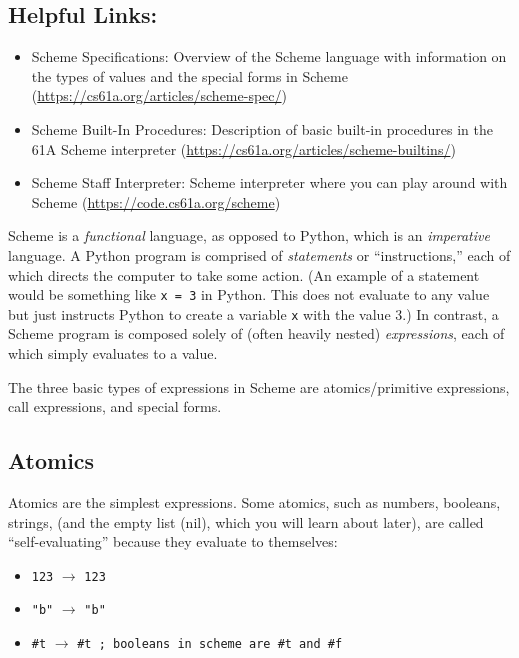 \subsection{Helpful Links:}
\begin{itemize}
    \item Scheme Specifications: Overview of the Scheme language with information on the types of values and the special forms in Scheme (\url{https://cs61a.org/articles/scheme-spec/})
    \item Scheme Built-In Procedures: Description of basic built-in procedures in the 61A Scheme interpreter (\url{https://cs61a.org/articles/scheme-builtins/})
    \item Scheme Staff Interpreter: Scheme interpreter where you can play around with Scheme (\url{https://code.cs61a.org/scheme}) 
\end{itemize}

Scheme is a \textit{functional} language, as opposed to Python, which is an \textit{imperative} language. A Python program is comprised of \textit{statements} or ``instructions,'' each of which directs the computer to take some action. (An example of a statement would be something like \lstinline{x = 3} in Python. This does not evaluate to any value but just instructs Python to create a variable \lstinline{x} with the value 3.) In contrast, a Scheme program is composed solely of (often heavily nested) \textit{expressions}, each of which simply evaluates to a value. 

The three basic types of expressions in Scheme are atomics/primitive expressions, call expressions, and special forms.  

\subsection{Atomics}

Atomics are the simplest expressions. Some atomics, such as numbers, booleans, strings, (and the empty list (nil), which you will learn about later), are called ``self-evaluating'' because they evaluate to themselves: 
\begin{itemize}
    \item \lstinline{123} $\rightarrow$ \lstinline{123}
    \item \lstinline{"b"} $\rightarrow$ \lstinline{"b"}
    \item \lstinline{#t} $\rightarrow$ \lstinline{#t ; booleans in scheme are #t and #f}
\end{itemize}

